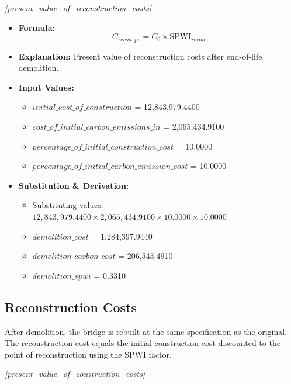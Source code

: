 \documentclass[12pt,a4paper]{article}
\begin{document}
\textit{[present\_value\_of\_reconstruction\_costs]}

\begin{itemize}
  \item \textbf{Formula:} $$C_{recon,pv} = C_0 \times \text{SPWI}_{recon}$$
  \item \textbf{Explanation:} Present value of reconstruction costs after end-of-life demolition.
  \item \textbf{Input Values:}
  \begin{itemize}
    \item $initial\_cost\_of\_construction$ = 12,843,979.4400
    \item $cost\_of\_initial\_carbon\_emissions\_in$ = 2,065,434.9100
    \item $percentage\_of\_initial\_construction\_cost$ = 10.0000
    \item $percentage\_of\_initial\_carbon\_emission\_cost$ = 10.0000
  \end{itemize}
  \item \textbf{Substitution \& Derivation:}
  \begin{itemize}
    \item Substituting values: $12,843,979.4400 \times 2,065,434.9100 \times 10.0000 \times 10.0000$
    \item $demolition\_cost$ = 1,284,397.9440
    \item $demolition\_carbon\_cost$ = 206,543.4910
    \item $demolition\_spwi$ = 0.3310
  \end{itemize}
\end{itemize}


\subsection{Reconstruction Costs}

After demolition, the bridge is rebuilt at the same specification as the original. The reconstruction cost equals the initial construction cost discounted to the point of reconstruction using the SPWI factor.


\textit{[present\_value\_of\_construction\_costs]}
\end{document}
